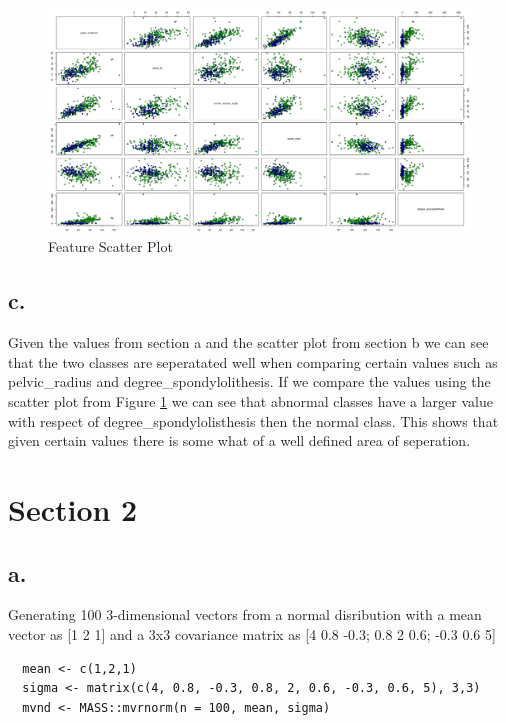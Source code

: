 \documentclass{report}
\begin{document}
\begin{figure}[h!]
  \includegraphics[width=\linewidth]{FeatureScatterPlot.png}
  \caption{Feature Scatter Plot}
  \label{fig:FeatureScatterPlot}
\end{figure}

\section{c.}

Given the values from section a and the scatter plot from section b we can see that the two classes are seperatated well when comparing certain values such as pelvic\_radius and degree\_spondylolithesis. If we compare the values using the scatter plot from Figure \ref{fig:FeatureScatterPlot} we can see that abnormal classes have a larger value with respect of degree\_spondylolisthesis then the normal class. This shows that given certain values there is some what of a well defined area of seperation.

\chapter{Section 2}

\section{a.}

Generating 100 3-dimensional vectors from a normal disribution with a mean vector as [1 2 1] and a 3x3 covariance matrix as [4  0.8 -0.3; 0.8 2 0.6; -0.3 0.6 5]

\begin{verbatim}
  mean <- c(1,2,1)
  sigma <- matrix(c(4, 0.8, -0.3, 0.8, 2, 0.6, -0.3, 0.6, 5), 3,3)
  mvnd <- MASS::mvrnorm(n = 100, mean, sigma)
\end{verbatim}
\end{document}
